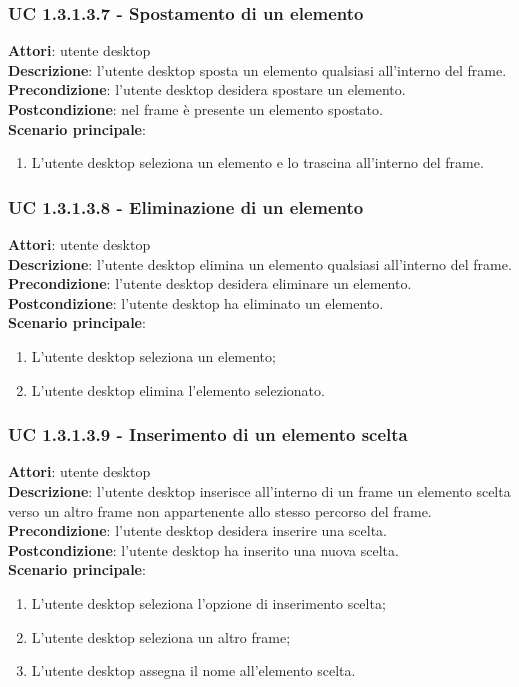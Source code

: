 \subsubsection{UC 1.3.1.3.7 - Spostamento di un elemento}{
	\label{uc1.3.1.3.7}
	\textbf{Attori}: utente desktop \\
	\textbf{Descrizione}: l'utente desktop sposta un elemento qualsiasi all'interno del frame. \\
	\textbf{Precondizione}: l'utente desktop desidera spostare un elemento.	\\
	\textbf{Postcondizione}: nel frame è presente un elemento spostato.	\\
	\textbf{Scenario principale}:
	\begin{enumerate}
		\item L'utente desktop seleziona un elemento e lo trascina all'interno del frame.
	\end{enumerate}
	}
\subsubsection{UC 1.3.1.3.8 - Eliminazione di un elemento}{
	\label{uc1.3.1.3.8}
	\textbf{Attori}: utente desktop \\
	\textbf{Descrizione}: l'utente desktop elimina un elemento qualsiasi all'interno del frame. \\
	\textbf{Precondizione}: l'utente desktop desidera eliminare un elemento.	\\
	\textbf{Postcondizione}: l'utente desktop ha eliminato un elemento.	\\
	\textbf{Scenario principale}:
	\begin{enumerate}
		\item L'utente desktop seleziona un elemento;
		\item L'utente desktop elimina l'elemento selezionato.
	\end{enumerate}
	}
\subsubsection{UC 1.3.1.3.9 - Inserimento di un elemento scelta}{
	\label{uc1.3.1.3.9}
	\textbf{Attori}: utente desktop \\
	\textbf{Descrizione}: l'utente desktop inserisce all'interno di un frame un elemento scelta verso un altro frame non appartenente allo stesso percorso del frame. \\
	\textbf{Precondizione}: l'utente desktop desidera inserire una scelta.	\\
	\textbf{Postcondizione}: l'utente desktop ha inserito una nuova scelta.	\\
	\textbf{Scenario principale}:
	\begin{enumerate}
		\item L'utente desktop seleziona l'opzione di inserimento scelta;
		\item L'utente desktop seleziona un altro frame;
		\item L'utente desktop assegna il nome all'elemento scelta.
	\end{enumerate}
	}
